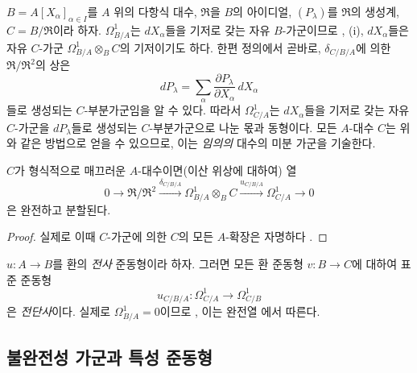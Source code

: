 \begin{example}[20.5.13]
\label{0.20.5.13-ko}
$B=A[X_\alpha]_{\alpha\in I}$를 $A$ 위의 다항식 대수,
$\mathfrak R$을 $B$의 아이디얼, $(P_\lambda)$를
$\mathfrak R$의 생성계, $C=B/\mathfrak R$이라 하자.
$\Omega^1_{B/A}$는 $dX_\alpha$들을 기저로 갖는 자유
$B$-가군이므로 , (i), $dX_\alpha$들은 자유
$C$-가군 $\Omega^1_{B/A}\otimes_B C$의 기저이기도 하다. 한편
정의에서 곧바로, $\delta_{C/B/A}$에 의한
$\mathfrak R/\mathfrak R^2$의 상은
\[
  dP_\lambda=\sum_\alpha
  \frac{\partial P_\lambda}{\partial X_\alpha}\,dX_\alpha
\]
들로 생성되는 $C$-부분가군임을 알 수 있다. 따라서
$\Omega^1_{C/A}$는 $dX_\alpha$들을 기저로 갖는 자유
$C$-가군을 $dP_\lambda$들로 생성되는 $C$-부분가군으로 나눈
몫과 동형이다. 모든 $A$-대수 $C$는 위와 같은 방법으로 얻을 수
있으므로, 이는 \emph{임의의} 대수의 미분 가군을 기술한다.
\end{example}

\begin{corollary}[20.5.14]
\label{0.20.5.14-ko}
$C$가 형식적으로 매끄러운 $A$-대수이면(이산 위상에 대하여) 열
\begin{equation}
\tag{20.5.14.1}
\label{0.20.5.14.1-ko}
  0\longrightarrow\mathfrak R/\mathfrak R^2
  \xrightarrow{\delta_{C/B/A}}\Omega^1_{B/A}\otimes_B C
  \xrightarrow{u_{C/B/A}}\Omega^1_{C/A}\longrightarrow0
\end{equation}
은 완전하고 분할된다.
\end{corollary}

\begin{proof}
실제로 이때 $C$-가군에 의한 $C$의 모든 $A$-확장은 자명하다
.
\end{proof}

\begin{remark}[20.5.15]
\label{0.20.5.15-ko}
$u:A\to B$를 환의 \emph{전사} 준동형이라 하자. 그러면 모든 환
준동형 $v:B\to C$에 대하여 표준 준동형
\begin{equation}
\tag{20.5.15.1}
\label{0.20.5.15.1-ko}
  u_{C/B/A}:\Omega^1_{C/A}\longrightarrow\Omega^1_{C/B}
\end{equation}
은 \emph{전단사}이다. 실제로
$\Omega^1_{B/A}=0$이므로 , 이는 완전열
에서 따른다.
\end{remark}

\subsection{불완전성 가군과 특성 준동형}
\label{subsection:0.20.6-ko}
\label{0.20.6-ko}

